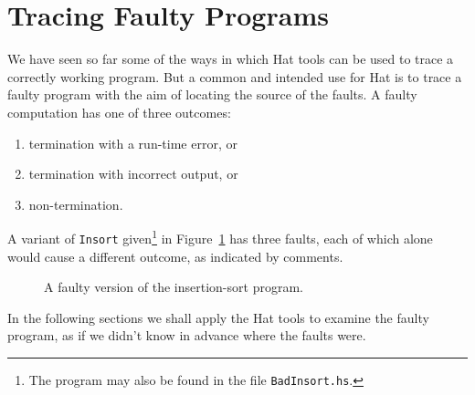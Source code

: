 \documentclass[12pt]{article}
\begin{document}
\section{Tracing Faulty Programs}

We have seen so far some of the ways in which Hat tools can be used
to trace a correctly working program.  But a common and intended use
for Hat is to trace a faulty program with the aim of locating the
source of the faults.  A faulty computation has one of three outcomes:
\begin{enumerate}
\item
termination with a run-time error, or
\item
termination with incorrect output, or
\item
non-termination.
\end{enumerate}
A variant of {\tt Insort}
given\footnote{The program may also be found in the file {\tt BadInsort.hs}.}
in Figure~\ref{badinsort} has three faults,
each of which alone
would cause a different outcome, as indicated by comments.
\begin{figure}[t]
\caption{\label{badinsort}A faulty version of the insertion-sort program.}
\end{figure}
In the following sections we shall apply the Hat tools to examine the
faulty program, as if we didn't know in advance where the faults were.
\end{document}
